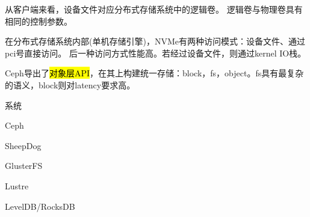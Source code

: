 从客户端来看，设备文件对应分布式存储系统中的逻辑卷。
逻辑卷与物理卷具有相同的控制参数。

在分布式存储系统内部(单机存储引擎)，NVMe有两种访问模式：设备文件、通过pci号直接访问。
后一种访问方式性能高。若经过设备文件，则通过kernel IO栈。

Ceph导出了\hl{对象层API}，在其上构建统一存储：block，fs，object。fs具有最复杂的语义，block则对latency要求高。

系统
\begin{enumbox}
\item Ceph
\item SheepDog
\item GlusterFS
\item Lustre
\item LevelDB/RocksDB
\end{enumbox}
